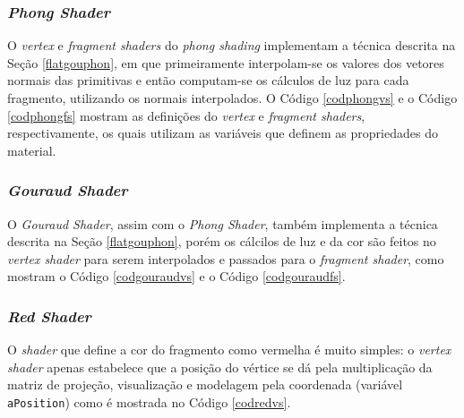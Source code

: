 \subsubsection{\textit{Phong Shader}}

	O \textit{vertex} e \textit{fragment shaders} do \textit{phong shading} implementam a técnica descrita na Seção \ref{flatgouphon}, em que primeiramente interpolam-se os valores dos vetores normais das primitivas e então computam-se os cálculos de luz para cada fragmento, utilizando os normais interpolados. O Código \ref{codphongvs} e o Código \ref{codphongfs} mostram as definições do \textit{vertex} e \textit{fragment shaders}, respectivamente, os quais utilizam as variáveis que definem as propriedades do material.  

	

	

\subsubsection{\textit{Gouraud Shader}}

	O \textit{Gouraud Shader}, assim com o \textit{Phong Shader}, também implementa a técnica descrita na Seção \ref{flatgouphon}, porém os cálcilos de luz e da cor são feitos no \textit{vertex shader} para serem interpolados e passados para o \textit{fragment shader}, como mostram o Código \ref{codgouraudvs} e o Código \ref{codgouraudfs}. 

	

	
	
\subsubsection{\textit{Red Shader}}
	
	O \textit{shader} que define a cor do fragmento como vermelha é muito simples:  o \textit{vertex shader} apenas estabelece que a posição do vértice  se dá pela multiplicação da matriz de projeção, visualização e modelagem pela coordenada (variável \texttt{aPosition}) como é mostrada no Código \ref{codredvs}. 
	
